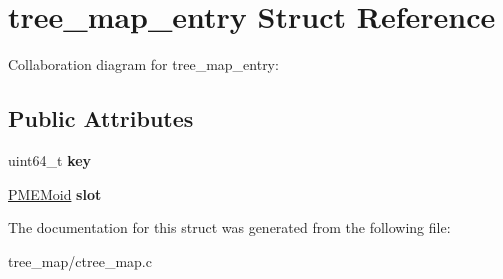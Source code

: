 \hypertarget{structtree__map__entry}{}\section{tree\+\_\+map\+\_\+entry Struct Reference}
\label{structtree__map__entry}


Collaboration diagram for tree\+\_\+map\+\_\+entry\+:
\subsection*{Public Attributes}
\begin{DoxyCompactItemize}
\item 
\mbox{\label{structtree__map__entry_af84cc67330d703d2cf506dadfda7e9eb}} 
uint64\+\_\+t {\bfseries key}
\item 
\mbox{\label{structtree__map__entry_ab54609c92fd3f584ca035f410a2dcc05}} 
\hyperlink{structpmemoid}{P\+M\+E\+Moid} {\bfseries slot}
\end{DoxyCompactItemize}


The documentation for this struct was generated from the following file\+:\begin{DoxyCompactItemize}
\item 
tree\+\_\+map/ctree\+\_\+map.\+c\end{DoxyCompactItemize}
